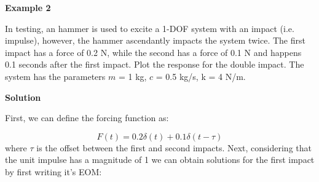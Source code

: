 \documentclass[12pt,a4paper]{article}
\begin{document}


\textbf{Example 2}

In testing, an hammer is used to excite a 1-DOF system with an impact (i.e. impulse), however, the hammer ascendantly impacts the system twice. The first impact has a force of 0.2 N, while the second has a force of 0.1 N and happens 0.1 seconds after the first impact. Plot the response for the double impact. The system has the parameters $m$ = 1 kg, $c$ = 0.5 kg/s, k = 4 N/m. 

\textbf{Solution }

First, we can define the forcing function as:

\begin{equation}
	F(t) = 0.2 \delta (t) + 0.1 \delta(t-\tau)
\end{equation}
where $\tau$ is the offset between the first and second impacts. Next, considering that the unit impulse has a magnitude of 1 we can obtain solutions for the first impact by first writing it's EOM:
\end{document}
